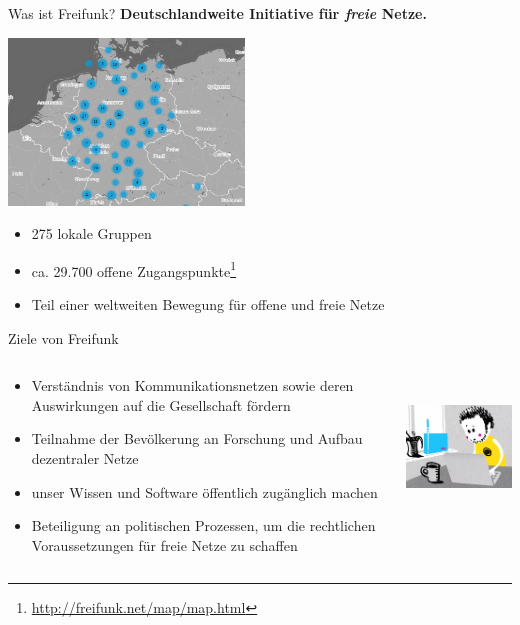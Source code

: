 \documentclass[10pt]{beamer}
\begin{document}
    \begin{frame}{Was ist Freifunk?}
      \large \textbf{Deutschlandweite Initiative für \emph{freie} Netze.}
      \pause
      \begin{center}
        \includegraphics[height=12em]{images/2016-02-17_map-de}
      \end{center}
      \begin{itemize}
        \item 275 lokale Gruppen
        \item ca. 29.700 offene Zugangspunkte\footnote{\url{http://freifunk.net/map/map.html}}
        \item Teil einer weltweiten Bewegung für offene und freie Netze
      \end{itemize}
    \end{frame}

    \begin{frame}{Ziele von Freifunk}
      \begin{columns}[T]
        \begin{column}{5cm}
        	\begin{itemize}[<+->]
        		\item Verständnis von Kommunikationsnetzen sowie deren Auswirkungen auf die Gesellschaft fördern
        		\item Teilnahme der Bevölkerung an Forschung und Aufbau dezentraler Netze
        		\item unser Wissen und Software öffentlich zugänglich machen
        		\item Beteiligung an politischen Prozessen, um die rechtlichen Voraussetzungen für freie Netze zu schaffen
        	\end{itemize}
        \end{column}
        \begin{column}{5cm}
          \includegraphics[height=10em]{images/install}
        \end{column}
      \end{columns}
    \end{frame}
\end{document}
